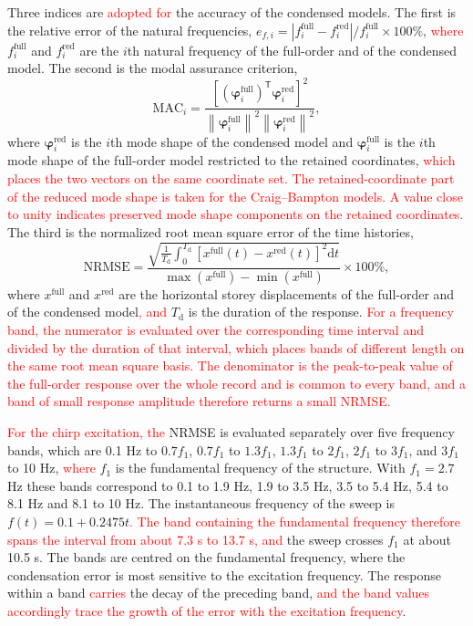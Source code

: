 \documentclass[11pt,a4paper]{article}
\numberwithin{equation}{section}
\newcommand{\rev}[1]{\textcolor{red}{#1}}
\begin{document}
Three indices are \rev{adopted for} the accuracy of the condensed models. The first is the relative error of the natural frequencies, \(e_{f,i}=|f_{i}^{\mathrm{full}}-f_{i}^{\mathrm{red}}|/f_{i}^{\mathrm{full}}\times100\%\), \rev{where} \(f_{i}^{\mathrm{full}}\) and \(f_{i}^{\mathrm{red}}\) are the \(i\)th natural frequency of the full-order and of the condensed model. The second is the modal assurance criterion,
\begin{equation}
	\mathrm{MAC}_{i}=
	\frac{\left[\left(\bm{\varphi}_{i}^{\mathrm{full}}\right)^{\mathsf{T}}
		\bm{\varphi}_{i}^{\mathrm{red}}\right]^{2}}
	{\left\|\bm{\varphi}_{i}^{\mathrm{full}}\right\|^{2}
		\left\|\bm{\varphi}_{i}^{\mathrm{red}}\right\|^{2}},
	\label{eq:mac}
\end{equation}
where \(\bm{\varphi}_{i}^{\mathrm{red}}\) is the \(i\)th mode shape of the condensed model and \(\bm{\varphi}_{i}^{\mathrm{full}}\) is the \(i\)th mode shape of the full-order model restricted to the retained coordinates, \rev{which places the two vectors on the same coordinate set. The retained-coordinate part of the reduced mode shape is taken for the Craig--Bampton models. A value close to unity indicates preserved mode shape components on the retained coordinates.} The third is the normalized root mean square error of the time histories,
\begin{equation}
	\mathrm{NRMSE}=
	\frac{\displaystyle\sqrt{\frac{1}{T_{\mathrm{d}}}\int_{0}^{T_{\mathrm{d}}}
			\left[x^{\mathrm{full}}(t)-x^{\mathrm{red}}(t)\right]^{2}\mathrm{d}t}}
	{\max\left(x^{\mathrm{full}}\right)-\min\left(x^{\mathrm{full}}\right)}
	\times100\%,
	\label{eq:nrmse}
\end{equation}
where \(x^{\mathrm{full}}\) and \(x^{\mathrm{red}}\) are the horizontal storey displacements of the full-order and of the condensed model\rev{, and} \(T_{\mathrm{d}}\) is the duration of the response. \rev{For a frequency band, the numerator is evaluated over the corresponding time interval and divided by the duration of that interval, which places bands of different length on the same root mean square basis. The denominator is the peak-to-peak value of the full-order response over the whole record and is common to every band, and a band of small response amplitude therefore returns a small NRMSE.}

\rev{For the chirp excitation, the} NRMSE is evaluated separately over five frequency bands, which are 0.1 Hz to \(0.7f_{1}\), \(0.7f_{1}\) to \(1.3f_{1}\), \(1.3f_{1}\) to \(2f_{1}\), \(2f_{1}\) to \(3f_{1}\), and \(3f_{1}\) to 10 Hz, \rev{where} \(f_{1}\) is the fundamental frequency of the structure. With \(f_{1}=2.7\) Hz these bands correspond to 0.1 to 1.9 Hz, 1.9 to 3.5 Hz, 3.5 to 5.4 Hz, 5.4 to 8.1 Hz and 8.1 to 10 Hz. The instantaneous frequency of the sweep is \(f(t)=0.1+0.2475t\)\rev{. The band containing the fundamental frequency therefore spans the interval from about 7.3 s to 13.7 s, and} the sweep crosses \(f_{1}\) at about 10.5 s. The bands are centred on the fundamental frequency, where the condensation error is most sensitive to the excitation frequency. The response within a band \rev{carries} the decay of the preceding band, \rev{and the band values accordingly trace the growth of the error with the excitation frequency}.
\end{document}
